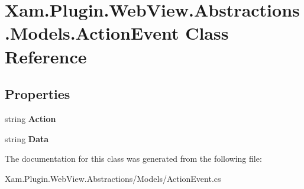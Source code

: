 \hypertarget{class_xam_1_1_plugin_1_1_web_view_1_1_abstractions_1_1_models_1_1_action_event}{}\section{Xam.\+Plugin.\+Web\+View.\+Abstractions.\+Models.\+Action\+Event Class Reference}
\label{class_xam_1_1_plugin_1_1_web_view_1_1_abstractions_1_1_models_1_1_action_event}
\subsection*{Properties}
\begin{DoxyCompactItemize}
\item 
\mbox{\label{class_xam_1_1_plugin_1_1_web_view_1_1_abstractions_1_1_models_1_1_action_event_af64109505e378170bfdaaa045213f143}} 
string {\bfseries Action}
\item 
\mbox{\label{class_xam_1_1_plugin_1_1_web_view_1_1_abstractions_1_1_models_1_1_action_event_ab82de0273752bdf68413567c9f00c77f}} 
string {\bfseries Data}
\end{DoxyCompactItemize}


The documentation for this class was generated from the following file\+:\begin{DoxyCompactItemize}
\item 
Xam.\+Plugin.\+Web\+View.\+Abstractions/\+Models/Action\+Event.\+cs\end{DoxyCompactItemize}

